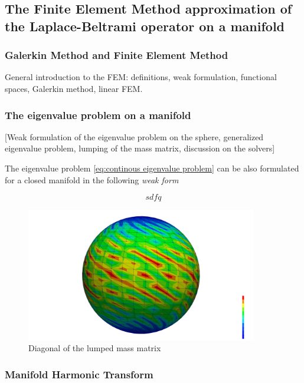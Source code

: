\subsection{The Finite Element Method approximation of the Laplace-Beltrami operator on a manifold}\label{sec:Chapter3: Using the Finite Element Method to approximate the Laplace-Beltrami operator on a manifold}


\subsubsection{Galerkin Method and Finite Element Method}
General introduction to the FEM: definitions, weak formulation, functional spaces, Galerkin method, linear FEM.
\subsubsection{The eigenvalue problem on a manifold}
[Weak formulation of the eigenvalue problem on the sphere, generalized eigenvalue problem, lumping of the mass matrix, discussion on the solvers]

The eigenvalue problem \ref{eq:continous eigenvalue problem} can be also formulated for a closed manifold in the following \textit{weak form}

\begin{equation}\label{eq:weak eigenvalue problem}
sdfq
\end{equation}

\begin{figure}[h]
	\label{fig:Lumping}
	\centering
	\includegraphics[width=0.9\textwidth]{figs/Chapter3/B_diagonal.png}

	\caption{Diagonal of the lumped mass matrix}
\end{figure}
\subsubsection{Manifold Harmonic Transform}



